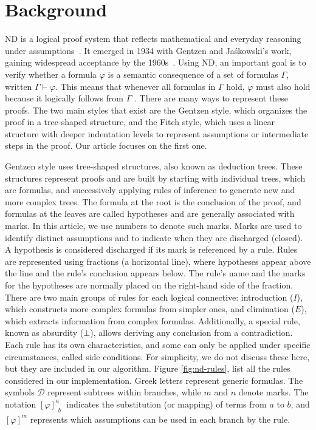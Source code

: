 \section{Background}

ND is a logical proof system that reflects mathematical and everyday reasoning under assumptions~\cite{nd-mancosu}. It emerged in 1934 with Gentzen and Jaśkowski's work, gaining widespread acceptance by the 1960s~\cite{Pelletier1999-FRAABH}. Using ND, an important goal is to verify whether a formula \(\varphi\) is a semantic consequence of a set of formulas \(\Gamma\), written \(\Gamma \vdash \varphi\). This means that whenever all formulas in \(\Gamma\) hold, \(\varphi\) must also hold because it logically follows from \(\Gamma\) \cite{gouveia_lgica1, gouveia_lgica2}. There are many ways to represent these proofs. The two main styles that exist are the Gentzen style, which organizes the proof in a tree-shaped structure, and the Fitch style, which uses a linear structure with deeper indentation levels to represent assumptions or intermediate steps in the proof. Our article focuses on the first one. 

Gentzen style uses tree-shaped structures, also known as deduction trees. These structures represent proofs and are built by starting with individual trees, which are formulas, and successively applying rules of inference to generate new and more complex trees. The formula at the root is the conclusion of the proof, and formulas at the leaves are called hypotheses and are generally associated with marks. In this article, we use numbers to denote such marks. Marks are used to identify distinct assumptions and to indicate when they are discharged (closed). A hypothesis is considered discharged if its mark is referenced by a rule. Rules are represented using fractions (a horizontal line), where hypotheses appear above the line and the rule’s conclusion appears below. The rule’s name and the marks for the hypotheses are normally placed on the right-hand side of the fraction. There are two main groups of rules for each logical connective: introduction (\(I\)), which constructs more complex formulas from simpler ones, and elimination (\(E\)), which extracts information from complex formulas. Additionally, a special rule, known as absurdity (\(\bot\)), allows deriving any conclusion from a contradiction. Each rule has its own characteristics, and some can only be applied under specific circumstances, called side conditions. For simplicity, we do not discuss these here, but they are included in our algorithm. Figure \ref{fig:nd-rules}, list all the rules considered in our implementation. Greek letters represent generic formulas. The symbols \( \mathcal{D} \) represent subtrees within branches, while \( m \) and \( n \) denote marks. The notation \(\displaystyle \left[ \varphi \right]^a_{\substack{b}}\) indicates the substitution (or mapping) of terms from \( a \) to \( b \), and \(\displaystyle [\varphi]^m\) represents which assumptions can be used in each branch by the rule.

